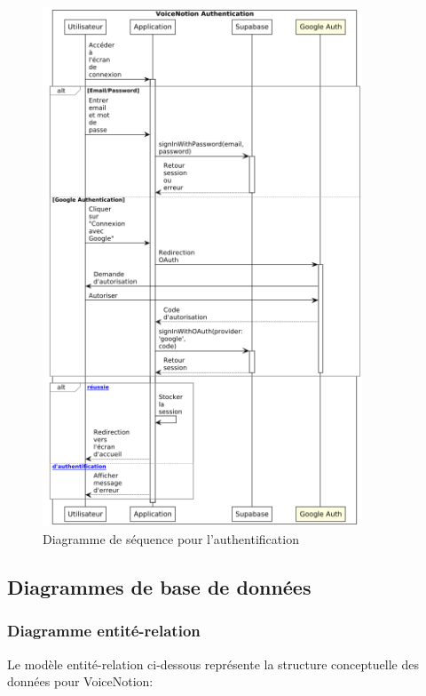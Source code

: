 \begin{figure}[H]
    \centering
    \includegraphics[width=0.85\textwidth]{assets/docs/voicenotion_auth_sequence.png}
    \caption{Diagramme de séquence pour l'authentification}
    \label{fig:sequence_auth}
\end{figure}

\subsection{Diagrammes de base de données}

\subsubsection{Diagramme entité-relation}

Le modèle entité-relation ci-dessous représente la structure conceptuelle des données pour VoiceNotion:

